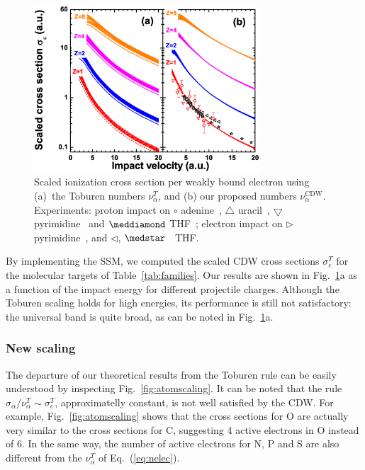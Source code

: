 \documentclass[preprint]{revtex4-2}
\begin{document}
\begin{figure}[t!]
\centering
\includegraphics[width=0.75\textwidth]{figuras/Fig_finales/fig4.eps}
\caption{Scaled ionization cross section per weakly bound electron using
(a)~the Toburen numbers $\nu_{\alpha}^T$, and (b) our proposed numbers
$\nu_{\alpha}^{\text{CDW}}$. Experiments: proton impact on 
\mbox{\Large$\circ$} adenine~\cite{iriki2011}, 
$\triangle$ uracil~\cite{itoh2013}, 
$\bigtriangledown$ pyrimidine~\cite{wolff2014} and $\meddiamond$ 
THF~\cite{wang2016}; electron impact on $\rhd$ pyrimidine~\cite{bug2017},
and $\lhd$, $\medstar$~\cite{wolf2019,fuss2009} THF.}
\label{fig:newscaling}
\end{figure}

By implementing the SSM, we computed the scaled CDW cross sections 
$\sigma_{e}^T$ for the molecular targets of Table~\ref{tab:families}.
Our results are shown in Fig.~\ref{fig:newscaling}a as a function of 
the impact energy for different projectile charges. Although the 
Toburen scaling holds for high energies, its performance is still not 
satisfactory: the universal band is quite broad, as can be noted in 
Fig.~\ref{fig:newscaling}a.

\subsubsection{New scaling}

The departure of our theoretical 
results from the Toburen rule can be easily understood 
by inspecting Fig.~\ref{fig:atomscaling}. It can be noted that the 
rule $\sigma_{\alpha}/\nu_{\alpha}^T\sim \sigma_{e}^T$, approximatelly 
constant, is not well satisfied by the CDW. 
For example, Fig.~\ref{fig:atomscaling} shows that the cross sections
for O are actually very similar to the cross sections for C, suggesting 
4 active electrons in O instead of 6. In the same way, the number of
active electrons for N, P and S are also different from the 
$\nu_{\alpha}^T$ of Eq.~(\ref{eq:nelec}). 
\end{document}
